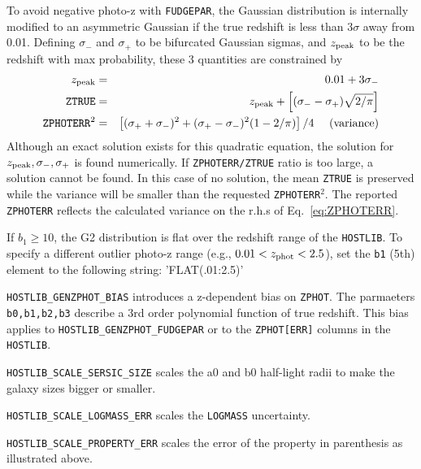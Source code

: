 \documentclass[12pt]{article}
\newcommand{\unc}{uncertainty}
\newcommand{\Zphot}{z_{\rm phot}}
\begin{document}
{\clearpage
\newcommand{\sigplus}{\sigma_{+}}
\newcommand{\sigminus}{\sigma_{-}}
\newcommand{\zpeak}{z_{\rm peak}}
To avoid negative photo-z with {\tt FUDGEPAR}, 
the Gaussian distribution is internally modified to an asymmetric
Gaussian if the true redshift is less than $3\sigma$ away from 0.01.
Defining $\sigminus$ and $\sigplus$ to be bifurcated Gaussian sigmas,
and $\zpeak$ to be the redshift with max probability,
these 3 quantities are constrained by
%
\begin{eqnarray}
  \zpeak      &  = & 0.01 + 3\sigminus \\
%
  {\tt ZTRUE} &  = & \zpeak + 
      \left[ (\sigminus - \sigplus)\sqrt{2/\pi}\right] \\
%
  {\tt ZPHOTERR}^2 & = & 
   \left[ (\sigplus+\sigminus)^2 + 
          (\sigplus-\sigminus)^2 (1-2/\pi) \right]/4  
    ~~~~{\rm (variance)} \label{eq:ZPHOTERR}
\end{eqnarray}
%
Although an exact solution exists for this quadratic equation,
the solution for $\zpeak,\sigminus,\sigplus$ is found numerically.
If {\tt ZPHOTERR/ZTRUE} ratio is too large, a solution cannot be found.
In this case of no solution, the mean {\tt ZTRUE} is preserved while 
the variance will be smaller than the requested {\tt ZPHOTERR}$^2$.
The reported {\tt ZPHOTERR} reflects the calculated variance on
the r.h.s of Eq.~\ref{eq:ZPHOTERR}.

If $b_1 \ge 10$, the G2 distribution is flat over
the redshift range of the {\tt HOSTLIB}. 
To specify a different outlier photo-z range (e.g., $0.01 < \Zphot < 2.5$), 
set the {\tt b1} (5th) 
element to the following string: 'FLAT(.01:2.5)'


{\tt HOSTLIB\_GENZPHOT\_BIAS} introduces a z-dependent bias on {\tt ZPHOT}.
The parmaeters {\tt b0,b1,b2,b3} describe a 3rd order polynomial function
of true redshift. This bias applies to {\tt HOSTLIB\_GENZPHOT\_FUDGEPAR} 
or to the {\tt ZPHOT[ERR]} columns in the {\tt HOSTLIB}.

{\tt HOSTLIB\_SCALE\_SERSIC\_SIZE} scales the a0 and b0 half-light radii
to make the galaxy sizes bigger or smaller.

{\tt HOSTLIB\_SCALE\_LOGMASS\_ERR} scales the {\tt LOGMASS} \unc.

{\tt HOSTLIB\_SCALE\_PROPERTY\_ERR} scales the error of the property in parenthesis as illustrated above.

}
\end{document}
